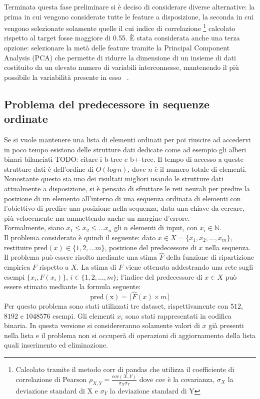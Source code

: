 \documentclass[12pt]{report}
\begin{document}
Terminata questa fase preliminare si è deciso di considerare diverse alternative: la prima in cui vengono considerate tutte le feature a disposizione, la seconda in cui vengono selezionate solamente quelle il cui indice di correlazione \footnote{Calcolato tramite il metodo corr di pandas che utilizza il coefficiente di correlazione di Pearson $\rho_{X,Y} = \frac{cov(X, Y)}{\sigma_X\sigma_Y}$ dove $cov$ è la covarianza, $\sigma_X$ la deviazione standard di X e $\sigma_Y$ la deviazione standard di Y} calcolato rispetto al target fosse maggiore di 0.55.
È stata considerata anche una terza opzione: selezionare la metà delle feature tramite la Principal Component Analysis (PCA) che permette di ridurre la dimensione di un insieme di dati costituito da un elevato numero di variabili interconnesse, mantenendo il più possibile la variabilità presente in esso ~\cite{PCA}. 

\subsection{Problema del predecessore in sequenze ordinate}\label{probPred}
Se si vuole mantenere una lista di elementi ordinati per poi riuscire ad accedervi in poco tempo esistono delle strutture dati dedicate come ad esempio gli alberi binari bilanciati TODO: citare i b-tree e b+-tree. Il tempo di accesso a queste strutture dati è dell'ordine di $O(log\,n)$, dove $n$ è il numero totale di elementi. Nonostante questo sia uno dei risultati migliori usando le strutture dati attualmente a disposizione, si è pensato di sfruttare le reti neurali per predire la posizione di un elemento all'interno di una sequenza ordinata di elementi con l'obiettivo di predire una posizione nella sequenza, data una chiave da cercare, più velocemente ma ammettendo anche un margine d'errore. \\
Formalmente, siano $x_1 \leq x_2 \leq \dots x_n$ gli $n$ elementi di input, con $x_i \in \mathbb{N}$.\\
Il problema considerato è quindi il seguente: dato $x \in X = \{x_1, x_2, \dots, x_m\}$, restituire $\mathrm{pred}(x) \in \{1, 2, \dots m\}$, posizione del predecessore di $x$ nella sequenza.
Il problema può essere risolto mediante una stima $\hat{F}$ della funzione di ripartizione empirica $F$ rispetto a $X$. La stima di $F$ viene ottenuta addestrando una rete sugli esempi $\{x_i, F(x_i)\}$, $i \in \{1, 2, \dots, m \}$; l'indice del predecessore di $x \in X$ può essere stimato mediante la formula seguente:
\begin{equation}
\mathrm{pred(x)} = \lceil\hat{F}(x)\times m\rceil
\label{empirical}
\end{equation}
Per questo problema sono stati utilizzati tre dataset, rispettivamente con $512$, $8192$ e $1048576$ esempi. Gli elementi $x_i$ sono stati rappresentati in codifica binaria. In questa versione si considereranno solamente valori di $x$ già presenti nella lista e il problema non si occuperà di operazioni di aggiornamento della lista quali inserimento ed eliminazione.
\end{document}
